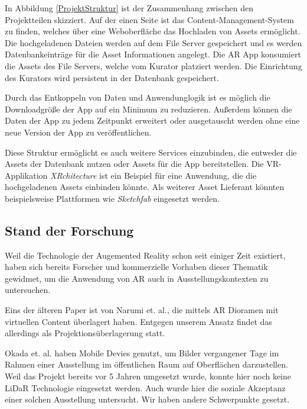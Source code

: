 \documentclass[titlepage, a4paper, 11pt]{scrartcl}
\begin{document}
  In Abbildung \ref{ProjektStruktur} ist der Zusammenhang zwischen den Projektteilen skizziert.
  Auf der einen Seite ist das Content-Management-System zu finden, welches über eine Weboberfläche das Hochladen von Assets ermöglicht.
  Die hochgeladenen Dateien werden auf dem File Server gespeichert und es werden Datenbankeinträge für die Asset Informationen angelegt.
  Die AR App konsumiert die Assets des File Servers, welche vom Kurator platziert werden. Die Einrichtung des Kurators wird persistent in der Datenbank gespeichert. 
  
  Durch das Entkoppeln von Daten und Anwendunglogik ist es möglich die Downloadgröße der App auf ein Minimum zu reduzieren.
  Außerdem können die Daten der App zu jedem Zeitpunkt erweitert oder ausgetauscht werden ohne eine neue Version der App zu veröffentlichen. 

  Diese Struktur ermöglicht es auch weitere Services einzubinden, die entweder die Assets der Datenbank nutzen oder Assets für die App bereitstellen.
  Die VR-Applikation \textit{XRchitecture} ist ein Beispiel für eine Anwendung, die die hochgeladenen Assets einbinden könnte.
  Als weiterer Asset Lieferant könnten beispielsweise Plattformen wie \textit{Sketchfab} eingesetzt werden. 

    \subsection{Stand der Forschung}

      Weil die Technologie der Augemented Reality schon seit einiger Zeit existiert, haben sich bereits Forscher und kommerzielle Vorhaben dieser Thematik gewidmet,
      um die Anwendung von AR auch in Ausstellungskontexten zu untersuchen.

      Eins der älteren Paper ist von Narumi et. al.\cite{narumi2011digital}, die mittels AR Dioramen mit virtuellen Content überlagert haben.
      Entgegen unserem Ansatz findet das allerdings als Projektionsüberlagerung statt.

      Okada et. al. haben Mobile Devies genutzt, um Bilder vergangener Tage im Rahmen einer Ausstellung im öffentlichen Raum auf Oberflächen darzustellen\cite{okada2015manseibashi}.
      Weil das Projekt bereits vor 5 Jahren umgesetzt wurde, konnte hier noch keine LiDaR Technologie eingesetzt werden. 
      Auch wurde hier die soziale Akzeptanz einer solchen Ausstellung untersucht. Wir haben andere Schwerpunkte gesetzt.
\end{document}
